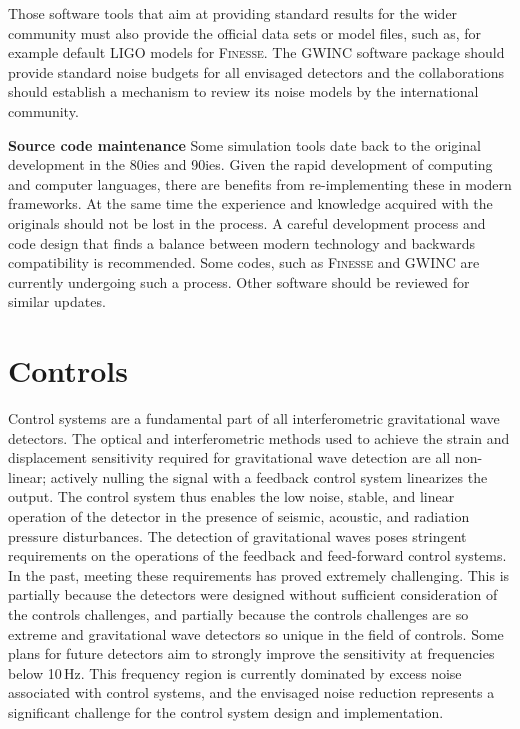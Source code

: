 Those software tools that aim at providing standard results for the wider community must also provide the official data sets or model files, such as, for example default LIGO models for \textsc{Finesse}. The GWINC software package should provide standard noise budgets for all envisaged detectors and the
collaborations should establish a mechanism to review its noise models by the international community.

\textbf{Source code maintenance}
Some simulation tools date back to the original development in the 80ies and 90ies. Given the rapid development of computing and computer languages,  there are benefits from re-implementing these in modern frameworks. At the same time the experience and knowledge acquired with the originals should not be lost in the process. A careful development process and code design that finds a balance between modern technology and backwards compatibility
is recommended. Some codes, such as \textsc{Finesse} and GWINC are currently undergoing such a process. Other software should be reviewed for similar updates.

\section{Controls}
\label{sec:Controls}
Control systems are a fundamental part of all interferometric gravitational wave detectors. The optical and interferometric methods used to achieve the strain and displacement sensitivity required for gravitational wave detection are all non-linear; actively nulling the signal with a feedback control system linearizes the output. The control system thus enables the low noise, stable, and linear operation of the detector in the presence of seismic, acoustic, and radiation pressure disturbances.
The detection of gravitational waves poses stringent requirements on the operations of the feedback and feed-forward control systems.
In the past, meeting these requirements has proved extremely challenging.
This is partially because the detectors were designed without sufficient consideration of the controls challenges, and partially because the controls challenges are so extreme and gravitational wave detectors so unique in the field of controls.
Some plans for future detectors aim to strongly improve the sensitivity at frequencies below 10\,Hz. This frequency region is currently dominated by excess noise associated with control systems, and the envisaged noise reduction represents a significant challenge for the control system design and implementation.

